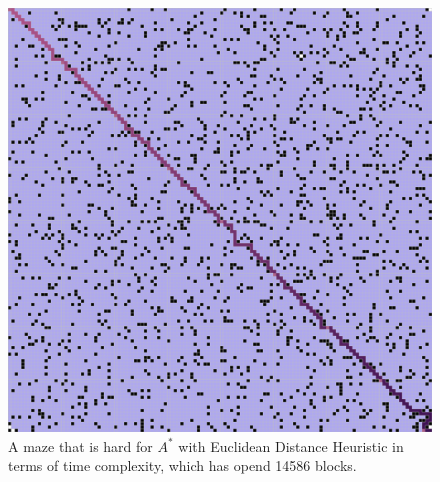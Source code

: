 \documentclass[letter]{article}
\begin{document}
\begin{enumerate}[resume]
\begin{enumerate}
\begin{enumerate}
\begin{figure}
					\includegraphics[width=\textwidth]{../pics/aeb/14586.png}
					\caption{\label{fig:aeb1}A maze that is hard for $ A^* $ with Euclidean Distance Heuristic in terms of time complexity, which has opend 14586 blocks.}
					

\end{figure}
\end{enumerate}
\end{enumerate}
\end{enumerate}
\end{document}
